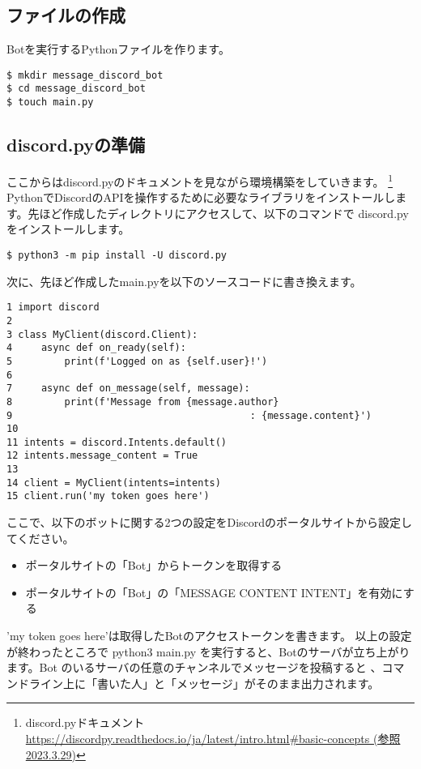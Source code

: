 \subsection{ファイルの作成}
Botを実行するPythonファイルを作ります。
\begin{shaded}
  \begin{verbatim}
$ mkdir message_discord_bot
$ cd message_discord_bot
$ touch main.py
\end{verbatim}
\end{shaded}

\subsection{discord.pyの準備}
ここからはdiscord.pyのドキュメントを見ながら環境構築をしていきます。
\footnote{discord.pyドキュメント\url{https://discordpy.readthedocs.io/ja/latest/intro.html\#basic-concepts (参照2023.3.29)}}
PythonでDiscordのAPIを操作するために必要なライブラリをインストールします。先ほど作成したディレクトリにアクセスして、以下のコマンドで discord.py をインストールします。
\begin{shaded}
  \begin{verbatim}
$ python3 -m pip install -U discord.py
\end{verbatim}
\end{shaded}
次に、先ほど作成したmain.pyを以下のソースコードに書き換えます。
\begin{tcolorbox}[breakable]
  \begin{verbatim}
1 import discord
2 
3 class MyClient(discord.Client):
4     async def on_ready(self):
5         print(f'Logged on as {self.user}!')
6 
7     async def on_message(self, message):
8         print(f'Message from {message.author}
9                                         : {message.content}')
10
11 intents = discord.Intents.default()
12 intents.message_content = True
13
14 client = MyClient(intents=intents)
15 client.run('my token goes here')
\end{verbatim}
\end{tcolorbox}
ここで、以下のボットに関する2つの設定をDiscordのポータルサイトから設定してください。
\begin{itemize}
  \item ポータルサイトの「Bot」からトークンを取得する
  \item ポータルサイトの「Bot」の「MESSAGE CONTENT INTENT」を有効にする
\end{itemize}
'my token goes here'は取得したBotのアクセストークンを書きます。
以上の設定が終わったところで python3 main.py を実行すると、Botのサーバが立ち上がります。Bot のいるサーバの任意のチャンネルでメッセージを投稿すると
、コマンドライン上に「書いた人」と「メッセージ」がそのまま出力されます。

